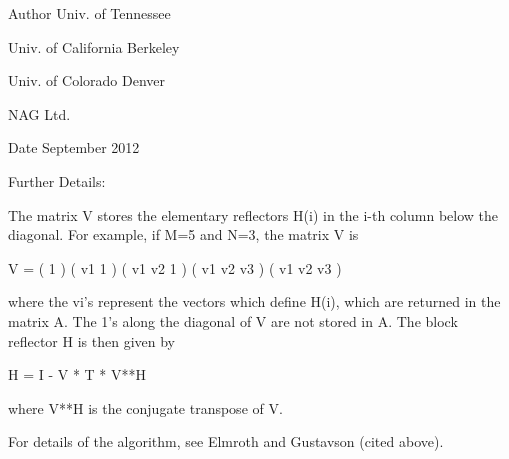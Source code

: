 \begin{DoxyAuthor}{Author}
Univ. of Tennessee 

Univ. of California Berkeley 

Univ. of Colorado Denver 

N\+A\+G Ltd. 
\end{DoxyAuthor}
\begin{DoxyDate}{Date}
September 2012 
\end{DoxyDate}
\begin{DoxyParagraph}{Further Details\+: }
\begin{DoxyVerb}  The matrix V stores the elementary reflectors H(i) in the i-th column
  below the diagonal. For example, if M=5 and N=3, the matrix V is

               V = (  1       )
                   ( v1  1    )
                   ( v1 v2  1 )
                   ( v1 v2 v3 )
                   ( v1 v2 v3 )

  where the vi's represent the vectors which define H(i), which are returned
  in the matrix A.  The 1's along the diagonal of V are not stored in A.  The
  block reflector H is then given by

               H = I - V * T * V**H

  where V**H is the conjugate transpose of V.

  For details of the algorithm, see Elmroth and Gustavson (cited above).\end{DoxyVerb}
 
\end{DoxyParagraph}
\hypertarget{group__complex16GEcomputational_ga42986fd49f5f845a013fb66134ce7847}{}

